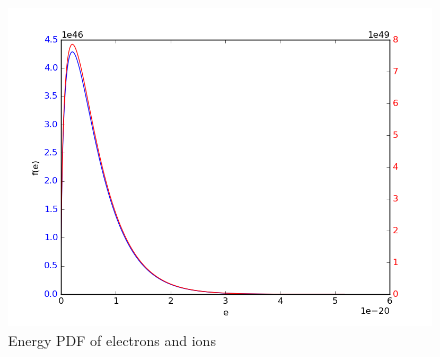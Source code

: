 \documentclass[11pt, a4paper]{article}
\begin{document}
\begin{figure}[H]
 \centering
 \includegraphics[scale = 0.5]{Plasma_energy.png}
 \caption{Energy PDF of electrons and ions}
 \label{fig:plasma_e}
\end{figure}
\end{document}
